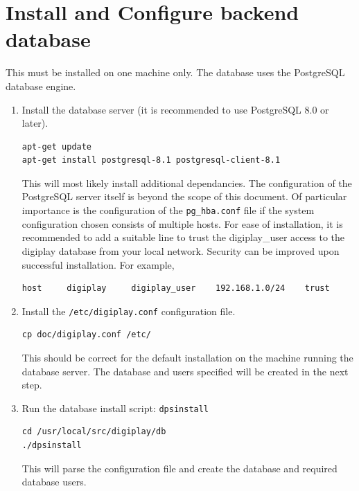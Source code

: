 \documentclass[a4paper,12pt]{report}
\numberwithin{equation}{section}
\begin{document}
\section{Install and Configure backend database}
This must be installed on one machine only. The database uses the PostgreSQL database engine.
\begin{enumerate}
\item Install the database server (it is recommended to use PostgreSQL 8.0 or later).
\begin{lstlisting}
apt-get update
apt-get install postgresql-8.1 postgresql-client-8.1
\end{lstlisting}
This will most likely install additional dependancies. The configuration of the PostgreSQL server itself is beyond the scope of this document. Of particular importance is the configuration of the \texttt{pg\_hba.conf} file if the system configuration chosen consists of multiple hosts. For ease of installation, it is recommended to add a suitable line to trust the digiplay\_user access to the digiplay database from your local network. Security can be improved upon successful installation. For example,
\begin{lstlisting}
host     digiplay     digiplay_user    192.168.1.0/24    trust
\end{lstlisting}
\item Install the \texttt{/etc/digiplay.conf} configuration file.
\begin{lstlisting}
cp doc/digiplay.conf /etc/
\end{lstlisting}
This should be correct for the default installation on the machine running the database server. The database and users specified will be created in the next step.
\item Run the database install script: \texttt{dpsinstall}
\begin{lstlisting}
cd /usr/local/src/digiplay/db
./dpsinstall
\end{lstlisting}
This will parse the configuration file and create the database and required database users.
\end{enumerate}
\end{document}
